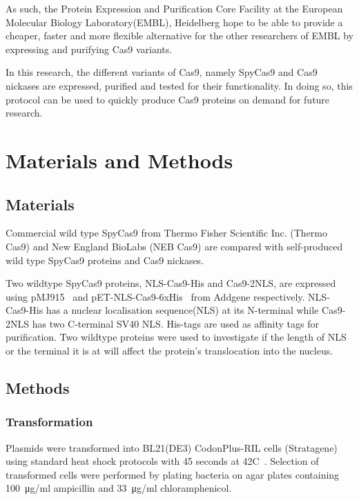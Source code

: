 \documentclass[11pt]{article}
\begin{document}
As such, the Protein Expression and Purification Core Facility at the European Molecular Biology Laboratory(EMBL), Heidelberg hope to be able to provide a cheaper, faster and more flexible alternative for the other researchers of EMBL by expressing and purifying Cas9 variants. 

In this research, the different variants of Cas9, namely SpyCas9 and Cas9 nickases are expressed, purified and tested for their functionality. In doing so, this protocol can be used to quickly produce Cas9 proteins on demand for future research. 

\newpage
\section{Materials and Methods}
\subsection{Materials}
Commercial wild type SpyCas9 from Thermo Fisher Scientific Inc. (Thermo Cas9) and New England BioLabs (NEB Cas9) are compared with self-produced wild type SpyCas9 proteins and Cas9 nickases.

Two wildtype SpyCas9 proteins, NLS-Cas9-His and Cas9-2NLS, are expressed using pMJ915~\citep{Lin2014a} and pET-NLS-Cas9-6xHis~\citep{Zuris2014} from Addgene respectively. NLS-Cas9-His has a nuclear localisation sequence(NLS) at its N-terminal while Cas9-2NLS has two C-terminal SV40 NLS. His-tags are used as affinity tags for purification. Two wildtype proteins were used to investigate if the length of NLS or the terminal it is at will affect the protein's translocation into the nucleus. 

\subsection{Methods}

\subsubsection{Transformation}
Plasmids were transformed into BL21(DE3) CodonPlus-RIL cells (Stratagene) using standard heat shock protocols with 45 seconds at 42\degree C~\citep{Sambrook2001}. Selection of transformed cells were performed by plating bacteria on agar plates containing \SI{100}{\micro\gram}/ml ampicillin and \SI{33}{\micro\gram}/ml chloramphenicol.
\end{document}
